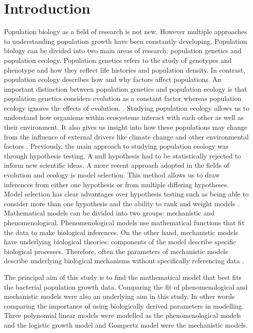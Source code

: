 \documentclass[11pt]{article}
\begin{document}
	\section{Introduction}
	Population biology as a field of research is not new. However multiple approaches to understanding population growth have been constantly developing. Population biology can be divided into two main areas of research: population genetics and population ecology. Population genetics refers to the study of genotypes and phenotype and how they reflect life histories and population density. In contrast, population ecology describes how and why factors affect populations. An important distinction between population genetics and population ecology is that population genetics considers evolution as a constant factor whereas population ecology ignores the effects of evolution. \citep{levins1966strategy}. Studying population ecology allows us to understand how organisms within ecosystems interact with each other as well as their environment. It also gives us insight into how these populations may change from the influence of external drivers like climate change and other environmental factors \citep{snider2013}. Previously, the main approach to studying population ecology was through hypothesis testing. A null hypothesis had to be statistically rejected to inform new scientific ideas. A more recent approach adopted in the fields of evolution and ecology is model selection. This method allows us to draw inferences from either one hypothesis or from multiple differing hypotheses. Model selection has clear advantages over hypothesis testing such as being able to consider more than one hypothesis and the ability to rank and weight models \citep{johnson2004model}. Mathematical models can be divided into two groups: mechanistic and phenomenological. Phenomenological models use mathematical functions that fit the data to make biological inferences. On the other hand, mechanistic models have underlying biological theories: components of the model describe specific biological processes. Therefore, often the parameters of mechanistic models describe underlying biological mechanisms without specifically referencing data \citep{white2019should}.
	
	The principal aim of this study is to find the mathematical model that best fits the bacterial population growth data. Comparing the fit of phenomenological and mechanistic models were also an underlying aim in this study. In other words comparing the importance of using biologically derived parameters in modelling. Three polynomial linear models were modelled as the phenomenological models and the logistic growth model \citep{verhulst1838notice} and Gompertz model \citep{zwietering1990modeling} were the mechanistic models. 
	
\end{document}
